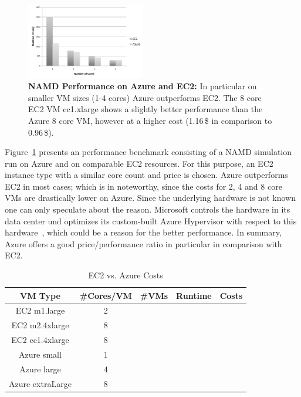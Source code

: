\documentclass[conference,final]{IEEEtran}
\begin{document}
\begin{figure}[htbp]
    \centering
        \includegraphics[width=0.46\textwidth]{performance/namd_ec2_azure.pdf}
    \caption{\textbf{NAMD Performance on Azure and EC2:} In particular on smaller VM sizes (1-4 cores) Azure 
    outperforms EC2. The 8 core EC2 VM cc1.xlarge shows a slightly better performance than the Azure 8 core VM,
    however at a higher cost (1.16\,\$ in comparison to 0.96\,\$).}
    \label{fig:performance_namd_ec2_azure}
\end{figure}

Figure~\ref{fig:performance_namd_ec2_azure} presents an performance 
benchmark consisting of a NAMD simulation run on Azure and on comparable 
EC2 resources. For this purpose, an EC2 instance type with a similar core
count and price is chosen. Azure outperforms EC2 in most cases;
which is in noteworthy, since the costs for 2, 4 and 8 core VMs are
drastically lower on Azure. Since the underlying hardware is not known
one can only speculate about the reason. Microsoft controls the
hardware in its data center und optimizes its custom-built Azure
Hypervisor with respect to this hardware~\cite{Krishnan:2010nx}, which
could be a reason for the better performance. In summary, Azure offers
a good price/performance ratio in particular in comparison with EC2.

\begin{table}[ht]
	\begin{tabular}{|c|c|c|c|c|}
        \hline
        VM Type         &\#Cores/VM &\#VMs &Runtime &Costs  \\ \hline
        EC2 m1.large    &2          &       &       &         \\ \hline
        EC2 m2.4xlarge  &8          &       &       &         \\ \hline
        EC2 cc1.4xlarge &8          &       &       &         \\ \hline
        Azure small     &1          &       &       &         \\ \hline
        Azure large     &4          &       &       &         \\ \hline
        Azure extraLarge &8         &       &       &         \\ \hline
	\end{tabular}
	\caption{EC2 vs. Azure Costs\label{tbl:costs}}
\end{table}
\end{document}
